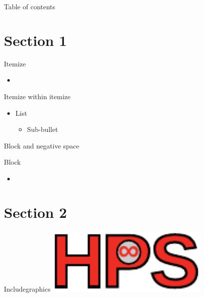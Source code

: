 \documentclass[compress,aspectratio=169]{beamer}
\begin{document}
\begin{frame}[plain]
	\titlepage
\end{frame}

\begin{frame}[t]{Table of contents}
  \tableofcontents[subsectionstyle=hide/hide]
\end{frame}


\section{Section 1}

\begin{frame}{Itemize}
  \begin{itemize}
    \item
  \end{itemize}
\end{frame}

\begin{frame}{Itemize within itemize}
    \begin{itemize}
        \item List
            \begin{itemize}
                \item Sub-bullet
            \end{itemize}
    \end{itemize}
\end{frame}

\begin{frame}{Block and negative space}
    \vspace*{-3em} %
    \begin{block}{Block}
        \begin{itemize}
            \item
        \end{itemize}
    \end{block}
\end{frame}


\section{Section 2}
\sectionIntroHidden %

\begin{frame}{Includegraphics}
    \centering
    \includegraphics[width=0.6\textwidth]{assets/hps-logo.pdf}\\
\end{frame}
\end{document}
